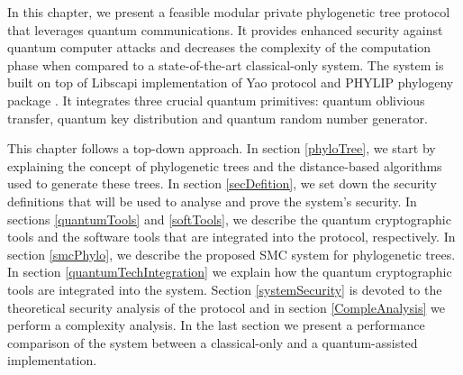 

In this chapter, we present a feasible modular private phylogenetic tree protocol that leverages quantum communications. It provides enhanced security against quantum computer attacks and decreases the complexity of the computation phase when compared to a state-of-the-art classical-only system. 
The system is built on top of Libscapi \cite{Libscapi} implementation of Yao protocol and PHYLIP phylogeny package \cite{PH78}. It integrates three crucial quantum primitives: quantum oblivious transfer, quantum key distribution and quantum random number generator.

This chapter follows a top-down approach. In section \ref{phyloTree}, we start by explaining the concept of phylogenetic trees and the distance-based algorithms used to generate these trees. In section \ref{secDefition}, we set down the security definitions that will be used to analyse and prove the system's security. %
In sections \ref{quantumTools} and \ref{softTools}, we describe the quantum cryptographic tools and the software tools that are integrated into the protocol, respectively. In section \ref{smcPhylo}, we describe the proposed SMC system for phylogenetic trees. In section \ref{quantumTechIntegration} we explain how the quantum cryptographic tools are integrated into the system. Section \ref{systemSecurity} is devoted to the theoretical security analysis of the protocol and in section \ref{CompleAnalysis} we perform a complexity analysis. In the last section we present a performance comparison of the system between a classical-only and a quantum-assisted implementation.



